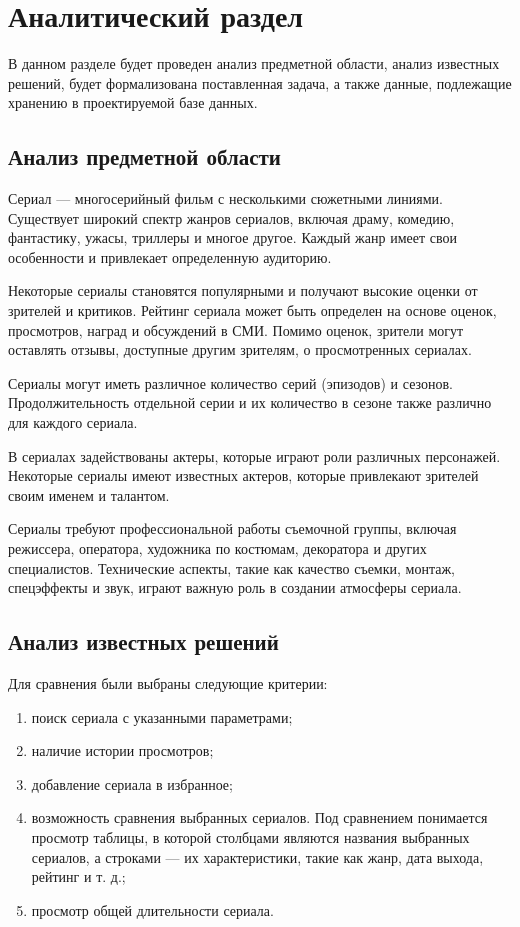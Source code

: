\chapter{Аналитический раздел}

В данном разделе будет проведен анализ предметной области, анализ известных решений, будет формализована поставленная задача, а также данные, подлежащие хранению в проектируемой базе данных.


\section{Анализ предметной области}

Сериал --- многосерийный фильм с несколькими сюжетными линиями.
Существует широкий спектр жанров сериалов, включая драму, комедию, фантастику, ужасы, триллеры и многое другое. 
Каждый жанр имеет свои особенности и привлекает определенную аудиторию.

Некоторые сериалы становятся популярными и получают высокие оценки от зрителей и критиков. 
Рейтинг сериала может быть определен на основе оценок, просмотров, наград и обсуждений в СМИ.
Помимо оценок, зрители могут оставлять отзывы, доступные другим зрителям, о просмотренных сериалах.

Сериалы могут иметь различное количество серий (эпизодов) и сезонов. 
Продолжительность отдельной серии и их количество в сезоне также различно для каждого сериала.

В сериалах задействованы актеры, которые играют роли различных персонажей. 
Некоторые сериалы имеют известных актеров, которые привлекают зрителей своим именем и талантом.

Сериалы требуют профессиональной работы съемочной группы, включая режиссера, оператора, художника по костюмам, декоратора и других специалистов.
Технические аспекты, такие как качество съемки, монтаж, спецэффекты и звук, играют важную роль в создании атмосферы сериала.

\section{Анализ известных решений}

Для сравнения были выбраны следующие критерии:
\begin{enumerate}
    \item поиск сериала с указанными параметрами;
    \item наличие истории просмотров;
    \item добавление сериала в избранное;
    \item возможность сравнения выбранных сериалов. Под сравнением понимается просмотр таблицы, в которой столбцами являются названия выбранных сериалов, а строками --- их характеристики, такие как жанр, дата выхода, рейтинг и т. д.;
    \item просмотр общей длительности сериала.
\end{enumerate}


